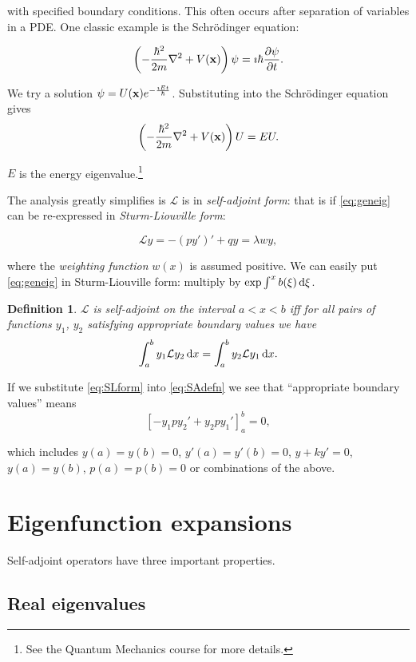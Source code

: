 \documentclass{notes}
\theoremstyle{plain}
\newtheorem{definition}[theorem]{Definition}
\newcommand{\cL}{\mathcal{L}}
\begin{document}
with specified boundary conditions.  This often occurs after
separation of variables in a PDE.  One classic example is the
Schr\"odinger equation:

\[
\left(- \frac{\hbar^2}{2 m} \nabla^2 + V(\mathbf{x}) \right) \psi = \imath
  \hbar \frac{\partial \psi}{\partial t}.
\]

We try a solution $\psi = U(\mathbf{x}) e^{-\frac{\imath E t}{\hbar}}$.
Substituting into the Schr\"odinger equation gives
\[
\left(- \frac{\hbar^2}{2 m} \nabla^2 + V(\mathbf{x}) \right) U  = E U.
\]

$E$ is the energy eigenvalue.\footnote{See the Quantum Mechanics
  course for more details.}

The analysis greatly simplifies is $\cL$ is in \emph{self-adjoint
  form}: that is if \eqref{eq:geneig} can be re-expressed in
\emph{Sturm-Liouville form}:

\begin{equation}\label{eq:SLform}
\cL y = - (p y')' + q y = \lambda w y,
\end{equation}

where the \emph{weighting function} $w(x)$ is assumed positive.  We
can easily put \eqref{eq:geneig} in Sturm-Liouville form: multiply by
$\exp \int^x b(\xi)\, \mathrm{d}\xi$.

\begin{definition}
$\cL$ is self-adjoint on the interval $a < x < b$ iff for all pairs of
functions $y_1$, $y_2$ satisfying appropriate boundary values we
have
\begin{equation}\label{eq:SAdefn}
\int_a^b y_1 \cL y_2\, \ud x = \int_a^b y_2 \cL y_1\, \ud x.
\end{equation}
\end{definition}

If we substitute \eqref{eq:SLform} into \eqref{eq:SAdefn} we see that
``appropriate boundary values'' means
\[
\left[ -y_1 p y_2' + y_2 p y_1' \right]_a^b = 0,
\]

which includes $y(a)=y(b)=0$, $y'(a) = y'(b) = 0$, $y +k y' = 0$,
$y(a) = y(b)$, $p(a) = p(b) = 0$ or combinations of the above.

\section{Eigenfunction expansions}

Self-adjoint operators have three important properties.

\subsection{Real eigenvalues}
\end{document}
